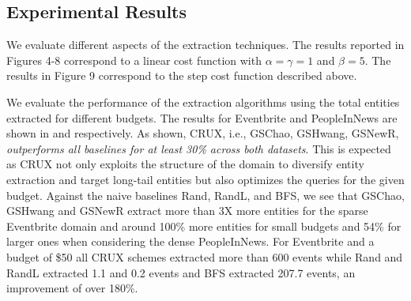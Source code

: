 
\subsection{Experimental Results}
We evaluate different aspects of the extraction techniques. The results reported in Figures 4-8 correspond to a linear cost function with $\alpha=\gamma=1$ and $\beta=5$. The results in Figure 9 correspond to the step cost function described above.

We evaluate the performance of the extraction algorithms using the total entities extracted for different budgets. The results for Eventbrite and PeopleInNews are shown in  and  respectively. As shown, CRUX, i.e., GSChao, GSHwang, GSNewR, {\em outperforms all baselines for at least 30\% across both datasets}. This is expected as CRUX not only exploits the structure of the domain to diversify entity extraction and target long-tail entities but also optimizes the queries for the given budget. Against the naive baselines Rand, RandL, and BFS, we see that GSChao, GSHwang and GSNewR extract more than 3X more entities for the sparse Eventbrite domain and around 100\% more entities for small budgets and 54\% for larger ones when considering the dense PeopleInNews. For Eventbrite and a budget of \$50 all CRUX schemes extracted more than 600 events while Rand and RandL extracted 1.1 and 0.2 events and BFS extracted 207.7 events, an improvement of over 180\%.

